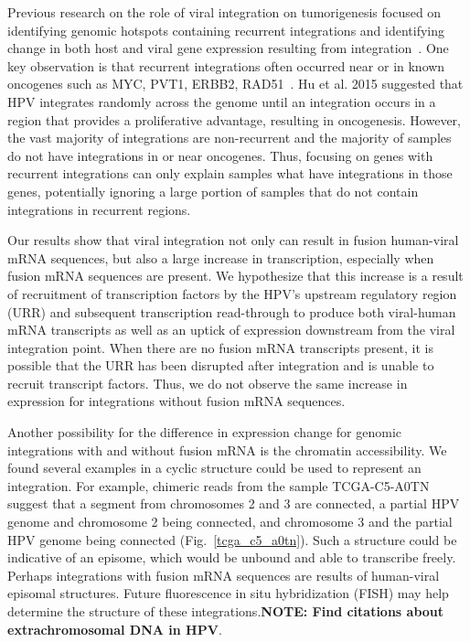 \documentclass[10pt]{article}
\begin{document}
Previous research on the role of viral integration on tumorigenesis focused on identifying genomic hotspots containing recurrent integrations and identifying change in both host and viral gene expression resulting from integration~\cite{Tang2013,Lawrence2015,Hu2015,Zhang2016}.  One key observation is that recurrent integrations often occurred near or in known oncogenes such as MYC, PVT1, ERBB2, RAD51~\cite{Tang2013}.  Hu et al. 2015 suggested that HPV integrates randomly across the genome until an integration occurs in a region that provides a proliferative advantage, resulting in oncogenesis.  However, the vast majority of integrations are non-recurrent and the majority of samples do not have integrations in or near oncogenes.  Thus, focusing on genes with recurrent integrations can only explain samples what have integrations in those genes, potentially ignoring a large portion of samples that do not contain integrations in recurrent regions.

Our results show that viral integration not only can result in fusion human-viral mRNA sequences, but also a large increase in transcription, especially when fusion mRNA sequences are present.  We hypothesize that this increase is a result of recruitment of transcription factors by the HPV's upstream regulatory region (URR) and subsequent transcription read-through to produce both viral-human mRNA transcripts as well as an uptick of expression downstream from the viral integration point.  When there are no fusion mRNA transcripts present, it is possible that the URR has been disrupted after integration and is unable to recruit transcript factors.  Thus, we do not observe the same increase in expression for integrations without fusion mRNA sequences.

Another possibility for the difference in expression change for genomic integrations with and without fusion mRNA is the chromatin accessibility.  We found several examples in a cyclic structure could be used to represent an integration.  For example, chimeric reads from the sample TCGA-C5-A0TN suggest that a segment from chromosomes 2 and 3 are connected, a partial HPV genome and chromosome 2 being connected, and chromosome 3 and the partial HPV genome being connected (Fig.~\ref{tcga_c5_a0tn}).  Such a structure could be indicative of an episome, which would be unbound and able to transcribe freely.  Perhaps integrations with fusion mRNA sequences are results of human-viral episomal structures.  Future fluorescence in situ hybridization (FISH) may help determine the structure of these integrations.\textbf{NOTE:  Find citations about extrachromosomal DNA in HPV}.
\end{document}
